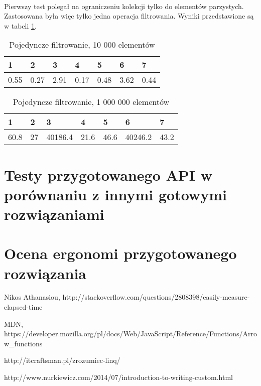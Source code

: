 \documentclass[a4paper,10pt]{report}
\begin{document}
\paragraph{}
Pierwszy test polegał na ograniczeniu kolekcji tylko do elementów parzystych. Zastosowana była więc tylko jedna operacja filtrowania. Wyniki przedstawione są w tabeli \ref{tab1}.
\begin{table}[t]
	\caption{Pojedyncze filtrowanie, 10 000 elementów}
	\label{tab1}
\begin{tabular}{|l|l|l|l|l|l|l|}
	\hline 
	1 & 2 & 3 & 4 & 5 & 6 & 7\\
	\hline
	0.55 & 0.27 & 2.91 & 0.17 & 0.48 & 3.62 & 0.44\\
	\hline
\end{tabular} 
\end{table}

\begin{table}[t]
	\caption{Pojedyncze filtrowanie, 1 000 000 elementów}
	\label{tab2}
	\begin{tabular}{|l|l|l|l|l|l|l|}
		\hline 
		1 & 2 & 3 & 4 & 5 & 6 & 7\\
		\hline
		60.8 & 27 & 40186.4 & 21.6 & 46.6 & 40246.2 & 43.2\\
		\hline
	\end{tabular} 
\end{table}

\section{Testy przygotowanego API w porównaniu z innymi gotowymi rozwiązaniami}
\section{Ocena ergonomi przygotowanego rozwiązania}
\begin{thebibliography}{9}
	
	Nikos Athanasiou,
	http://stackoverflow.com/questions/2808398/easily-measure-elapsed-time
	
	MDN,
	https://developer.mozilla.org/pl/docs/Web/JavaScript/Reference/Functions/Arrow\_functions
	
	http://itcraftsman.pl/zrozumiec-linq/

	http://www.nurkiewicz.com/2014/07/introduction-to-writing-custom.html

	
\end{thebibliography}
\end{document}
